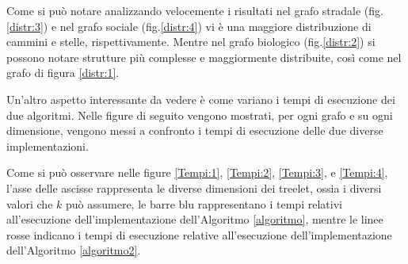 Come si può notare analizzando velocemente i risultati nel grafo stradale (fig.\ref{distr:3}) e nel grafo sociale (fig.\ref{distr:4}) vi è una maggiore distribuzione di cammini e stelle, rispettivamente.
Mentre nel grafo biologico (fig.\ref{distr:2}) si possono notare strutture più complesse e maggiormente distribuite, così come nel grafo di figura \ref{distr:1}.

Un'altro aspetto interessante da vedere è come variano i tempi di esecuzione dei due algoritmi.
Nelle figure di seguito vengono mostrati, per ogni grafo e su ogni dimensione,
vengono messi a confronto i tempi di esecuzione delle due diverse implementazioni.

Come si può osservare nelle figure \ref{Tempi:1}, \ref{Tempi:2}, \ref{Tempi:3}, e \ref{Tempi:4}, l'asse delle ascisse rappresenta le diverse dimensioni dei treelet, ossia i diversi valori che $ k $ può assumere, le barre blu rappresentano i tempi relativi all'esecuzione dell'implementazione dell'Algoritmo \ref{algoritmo}, %
mentre le linee rosse indicano i tempi di esecuzione relative all'esecuzione dell'implementazione dell'Algoritmo \ref{algoritmo2}. %
\\

